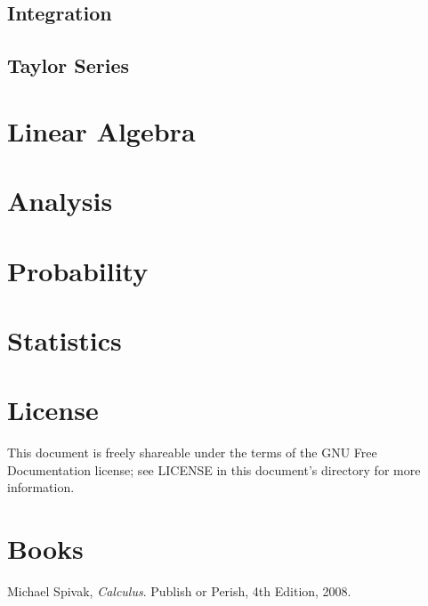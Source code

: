 \documentclass{article}
\begin{document}
\subsection{Integration}

\subsection{Taylor Series}

\section{Linear Algebra}

\section{Analysis}

\section{Probability}

\section{Statistics}

\section{License}

This document is freely shareable under the terms of the GNU Free Documentation
license; see LICENSE in this document's directory for more information.

\section{Books}

\begin{thebibliography}{9}

  Michael Spivak,
  \emph{Calculus}.
  Publish or Perish,
  4th Edition,
  2008.

\end{thebibliography}
\end{document}
